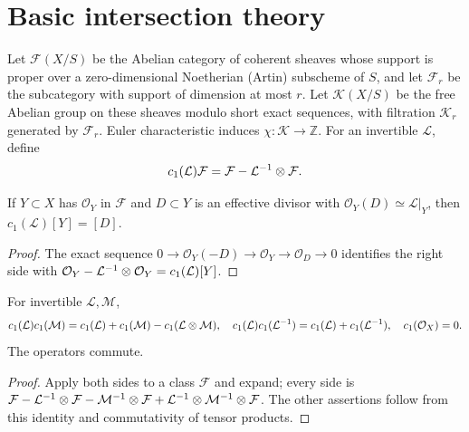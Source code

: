 \section{Basic intersection theory}\label{kps-sec-intersection}

\begin{definition}\label{kps-def-K}
Let $\mathcal F(X/S)$ be the Abelian category of coherent sheaves whose
support is proper over a zero-dimensional Noetherian (Artin) subscheme of
$S$, and let $\mathcal F_r$ be the subcategory with support of dimension at
most $r$. Let $\mathcal K(X/S)$ be the free Abelian group on these sheaves
modulo short exact sequences, with filtration $\mathcal K_r$ generated by
$\mathcal F_r$. Euler characteristic induces $\chi:\mathcal K\to\mathbb Z$.
For an invertible $\mathcal L$, define
\[
 c_1(\mathcal L)\mathcal F=\mathcal F-\mathcal L^{-1}\otimes\mathcal F.
\]
\end{definition}

\begin{lemma}\label{kps-lem-divisor-action}
If $Y\subset X$ has $\mathcal O_Y$ in $\mathcal F$ and $D\subset Y$ is an
effective divisor with $\mathcal O_Y(D)\simeq\mathcal L|_Y$, then
$c_1(\mathcal L)[Y]=[D]$.
\end{lemma}
\begin{proof}
The exact sequence $0\to\mathcal O_Y(-D)\to\mathcal O_Y\to\mathcal O_D\to0$
identifies the right side with
$\mathcal O_Y-\mathcal L^{-1}\otimes\mathcal O_Y=c_1(\mathcal L)[Y]$.
\end{proof}

\begin{lemma}\label{kps-lem-c1-additivity}
For invertible $\mathcal L,\mathcal M$,
\[
c_1(\mathcal L)c_1(\mathcal M)=c_1(\mathcal L)+c_1(\mathcal M)-c_1(\mathcal L\otimes\mathcal M),
\quad c_1(\mathcal L)c_1(\mathcal L^{-1})=c_1(\mathcal L)+c_1(\mathcal L^{-1}),
\quad c_1(\mathcal O_X)=0.
\]
The operators commute.
\end{lemma}
\begin{proof}
Apply both sides to a class $\mathcal F$ and expand; every side is
$\mathcal F-\mathcal L^{-1}\otimes\mathcal F-\mathcal M^{-1}\otimes\mathcal F+
\mathcal L^{-1}\otimes\mathcal M^{-1}\otimes\mathcal F$. The other assertions follow
from this identity and commutativity of tensor products.
\end{proof}

